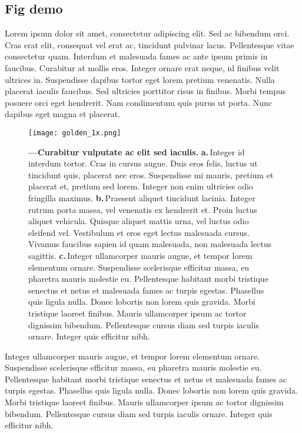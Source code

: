 \documentclass[./main.tex]{subfiles}
\begin{document}
\subsection{Fig demo} \label{sec:intro:2}

\par Lorem ipsum dolor sit amet, consectetur adipiscing elit. Sed ac bibendum orci. Cras erat elit, consequat vel erat ac, tincidunt pulvinar lacus. Pellentesque vitae consectetur quam. Interdum et malesuada fames ac ante ipsum primis in faucibus. Curabitur at mollis eros. Integer ornare erat neque, id finibus velit ultrices in. Suspendisse dapibus tortor eget lorem pretium venenatis. Nulla placerat iaculis faucibus. Sed ultricies porttitor risus in finibus. Morbi tempus posuere orci eget hendrerit. Nam condimentum quis purus ut porta. Nunc dapibus eget magna et placerat.

\begin{figure}[t!] %
	\centering				
	\texttt{[image: golden\_1x.png]}		
	\caption[A standard figure]
	{ \textbf{---\;Curabitur vulputate ac elit sed iaculis.}
	\textbf{a.}\,Integer id interdum tortor. Cras in cursus augue. Duis eros felis, luctus ut tincidunt quis, placerat nec eros. Suspendisse mi mauris, pretium et placerat et, pretium sed lorem. Integer non enim ultricies odio fringilla maximus.
	\textbf{b.}\,Praesent aliquet tincidunt lacinia. Integer rutrum porta massa, vel venenatis ex hendrerit et. Proin luctus aliquet vehicula. Quisque aliquet mattis urna, vel luctus odio eleifend vel. Vestibulum et eros eget lectus malesuada cursus. Vivamus faucibus sapien id quam malesuada, non malesuada lectus sagittis. 
	\textbf{c.}\,Integer ullamcorper mauris augue, et tempor lorem elementum ornare. Suspendisse scelerisque efficitur massa, eu pharetra mauris molestie eu. Pellentesque habitant morbi tristique senectus et netus et malesuada fames ac turpis egestas. Phasellus quis ligula nulla. Donec lobortis non lorem quis gravida. Morbi tristique laoreet finibus. Mauris ullamcorper ipsum ac tortor dignissim bibendum. Pellentesque cursus diam sed turpis iaculis ornare. Integer quis efficitur nibh.
	}
\label{fig:myfig}  %
\end{figure}

\par Integer ullamcorper mauris augue, et tempor lorem elementum ornare. Suspendisse scelerisque efficitur massa, eu pharetra mauris molestie eu. Pellentesque habitant morbi tristique senectus et netus et malesuada fames ac turpis egestas. Phasellus quis ligula nulla. Donec lobortis non lorem quis gravida. Morbi tristique laoreet finibus. Mauris ullamcorper ipsum ac tortor dignissim bibendum. Pellentesque cursus diam sed turpis iaculis ornare. Integer quis efficitur nibh.
\end{document}
